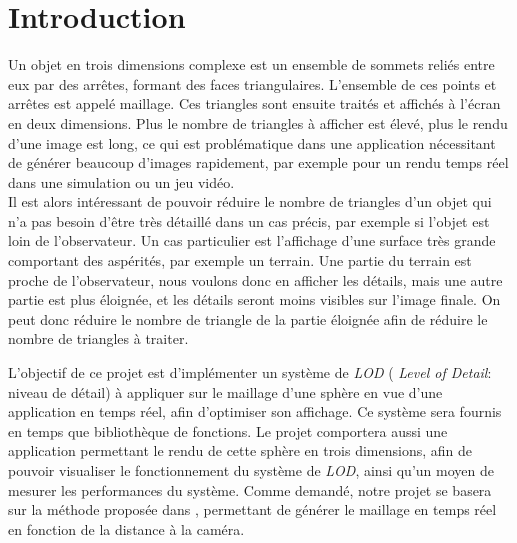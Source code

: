\documentclass[12pt]{report}
\begin{document}



\tableofcontents

\thispagestyle{empty} %


\newpage

\chapter*{Introduction}
\setcounter{chapter}{1}

Un objet en trois dimensions complexe est un ensemble de sommets reliés
entre eux par des arrêtes, formant des faces triangulaires. L'ensemble
de ces points et arrêtes est appelé maillage. Ces triangles sont ensuite
traités et affichés à l'écran en deux dimensions. Plus le nombre de
triangles à afficher est élevé, plus le rendu d'une image est long, ce
qui est problématique dans une application nécessitant de générer
beaucoup d'images rapidement, par exemple pour un rendu temps réel dans
une simulation ou un jeu vidéo.\\
Il est alors intéressant de pouvoir réduire le nombre de triangles d'un
objet qui n'a pas besoin d'être très détaillé dans un cas précis, par
exemple si l'objet est loin de l'observateur. Un cas particulier est
l'affichage d'une surface très grande comportant des aspérités, par
exemple un terrain. Une partie du terrain est proche de l'observateur,
nous voulons donc en afficher les détails, mais une autre partie est
plus éloignée, et les détails seront moins visibles sur l'image finale.
On peut donc réduire le nombre de triangle de la partie éloignée afin de
réduire le nombre de triangles à traiter.

L'objectif de ce projet est d'implémenter un système de \emph{LOD} (
\emph{Level of Detail}: niveau de détail) à appliquer sur le maillage
d'une sphère en vue d'une application en temps réel, afin d'optimiser
son affichage. Ce système sera fournis en temps que bibliothèque de
fonctions.
Le projet comportera aussi une application permettant le rendu de cette
sphère en trois dimensions, afin de pouvoir visualiser le fonctionnement
du système de \emph{LOD}, ainsi qu'un moyen de mesurer les performances
du système. Comme demandé, notre projet se basera sur la méthode
proposée dans \cite{CDLOD}, permettant de générer le maillage en temps
réel en fonction de la distance à la caméra. 
\end{document}
